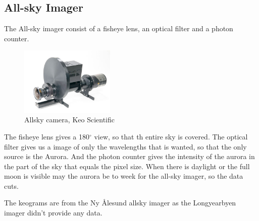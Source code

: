 \subsection{All-sky Imager}

The All-sky imager consist of a fisheye lens, an optical filter and a photon counter.

\begin{figure} 
\vspace{-20pt}
  \begin{center}
    \includegraphics[width=0.4\textwidth]{Figures/Allsky/ERD_072.jpg}
    \caption{Allsky camera, Keo Scientific }
    \label{fig:ACE}
  \end{center}
  \vspace{-20pt}
  \vspace{1pt}
\end{figure}


The fisheye lens gives a 180$^{\circ}$ view, so that th entire sky is covered. The optical filter gives us a image of only the wavelengths that is wanted, so that the only source is the Aurora. And the photon counter gives the intensity of the aurora in the part of the sky that equals the pixel size. When there is daylight or the full moon is visible may the aurora be to week for the all-sky imager, so the data cuts. 

The keograms are from the Ny \r{A}lesund allsky imager as the Longyearbyen imager didn't provide any data. 
